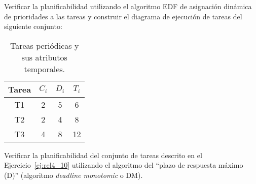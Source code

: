 \begin{ejercicio}\label{ej:rel4_10}
    Verificar la planificabilidad utilizando el algoritmo EDF de asignación dinámica de prioridades a las tareas y construir el diagrama de ejecución de tareas del siguiente conjunto:
    \begin{table}[H]
    \centering
    \begin{tabular}{|c|c|c|c|}
        \hline
        Tarea & $C_i$ & $D_i$ & $T_i$ \\
        \hline
        T1 & 2 & 5 & 6 \\
        \hline
        T2 & 2 & 4 & 8 \\
        \hline
        T3 & 4 & 8 & 12 \\
        \hline
    \end{tabular}
    \caption{Tareas periódicas y sus atributos temporales.}
    \label{tab:4_10}
    \end{table}
\end{ejercicio}

\begin{ejercicio}\label{ej:rel4_11}
    Verificar la planificabilidad del conjunto de tareas descrito en el Ejercicio~\ref{ej:rel4_10} utilizando el algoritmo del ``plazo de respuesta máximo (D)'' (algoritmo \textit{deadline monotomic} o DM).
\end{ejercicio}

